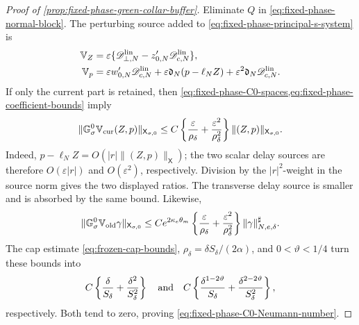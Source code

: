 \begin{proof}[Proof of
\cref{prop:fixed-phase-green-collar-buffer}]
Eliminate \(Q\) in \cref{eq:fixed-phase-normal-block}.  The perturbing
source added to \cref{eq:fixed-phase-principal-s-system} is
\begin{align}
 \mathbb V_Z
 &=\varepsilon\{\mathscr D_{\perp,N}^{\rm lin}
                    -z_{0,N}'\mathscr D_{c,N}^{\rm lin}\},\notag\\
 \mathbb V_p
 &=\varepsilon w_{0,N}'\mathscr D_{c,N}^{\rm lin}
   +\varepsilon\mathfrak d_N(p-\ell_NZ)
   +\varepsilon^2\mathfrak d_N\mathscr D_{c,N}^{\rm lin}.    \label{eq:fixed-phase-delay-perturbation}
\end{align}
If only the current part is retained, then
\cref{eq:fixed-phase-C0-spaces,eq:fixed-phase-coefficient-bounds} imply
\begin{equation}
 \|\mathbb G_\sigma^0\mathbb V_{\rm cur}(Z,p)\|_{
       \mathsf X_{\sigma,0}}
 \le C\left\{\frac{\varepsilon}{\rho_\delta}
                 +\frac{\varepsilon^2}{\rho_\delta^2}\right\}
       \|(Z,p)\|_{\mathsf X_{\sigma,0}}.          \label{eq:fixed-phase-current-feedback-proof}
\end{equation}
Indeed, \(p-\ell_NZ=O(|r|\|(Z,p)\|_{\mathsf X})\); the two scalar
delay sources are therefore \(O(\varepsilon|r|)\) and
\(O(\varepsilon^2)\), respectively.  Division by the
\(|r|^2\)-weight in the source norm gives the two displayed ratios.  The
transverse delay source is smaller and is absorbed by the same bound.
Likewise,
\begin{equation}
 \|\mathbb G_\sigma^0\mathbb V_{\rm old}\gamma\|_{
       \mathsf X_{\sigma,0}}
 \le Ce^{2\kappa_e\theta_m}
       \left\{\frac{\varepsilon}{\rho_\delta}
                 +\frac{\varepsilon^2}{\rho_\delta^2}\right\}
       \|\gamma\|_{N,e,\delta}^{\sharp}.         \label{eq:fixed-phase-old-feedback-proof}
\end{equation}
The cap estimate \cref{eq:frozen-cap-bounds},
\(\rho_\delta=\delta S_\delta/(2\alpha)\), and
\(0<\vartheta<1/4\) turn these bounds into
\begin{equation}
 C\left\{\frac{\delta}{S_\delta}
           +\frac{\delta^2}{S_\delta^2}\right\}
 \quad\hbox{and}\quad
 C\left\{\frac{\delta^{1-2\vartheta}}{S_\delta}
           +\frac{\delta^{2-2\vartheta}}{S_\delta^2}\right\},              \label{eq:fixed-phase-feedback-smallness}
\end{equation}
respectively.  Both tend to zero, proving
\cref{eq:fixed-phase-C0-Neumann-number}.


\end{proof}
